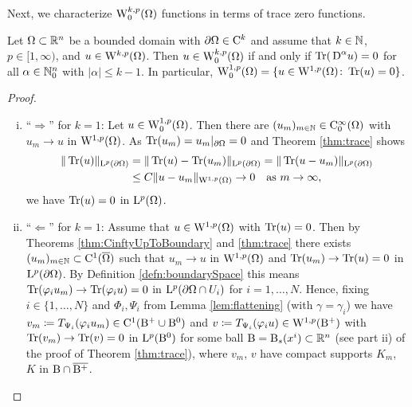 Next, we characterize $\mathrm{W}_0^{k,p}(\Omega)$ functions in terms of trace zero functions.

\begin{thm}
  Let $\Omega \subset \mathbb{R}^n$ be a bounded domain with $\partial\Omega \in \mathrm{C}^k$ and assume that $k \in \mathbb{N}$, $p \in [ 1, \infty)$, and $u \in \mathrm{W}^{k,p}(\Omega)$.
    Then
    $
    u \in \mathrm{W}_0^{k,p}(\Omega)$ if and only if $\operatorname{Tr}(\,{\operatorname{D}}^\alpha u) = 0$ for all  $\alpha \in \mathbb{N}_0^n$ with $|\alpha| \leq k - 1$.
    In particular, $\mathrm{W}_0^{1,p}(\Omega) = \{ u \in \mathrm{W}^{1,p}(\Omega) \colon \operatorname{Tr}(u) = 0 \}$.
\end{thm}

\begin{proof}
  \begin{enumerate}[i)]
    \item ``$\Rightarrow$'' for $k = 1$:
      Let $u \in \mathrm{W}_0^{1,p}(\Omega)$.
      Then there are $(u_m)_{m \in \mathbb{N}} \in \mathrm{C}_0^\infty(\Omega)$ with $u_m \to u$ in $\mathrm{W}^{1,p}(\Omega)$.
      As $\operatorname{Tr}(u_m) = u_m|_{\partial\Omega} = 0$ and Theorem \ref{thm:trace} shows
      \begin{align*}
        \| \operatorname{Tr}(u) \|_{\mathrm{L}^p(\partial\Omega)}
        &= \|\operatorname{Tr}(u) - \operatorname{Tr}(u_m)\|_{\mathrm{L}^p(\partial\Omega)}
        = \| \operatorname{Tr}(u - u_m) \|_{\mathrm{L}^p(\partial\Omega)} \\
        &\leq C \|u - u_m\|_{\mathrm{W}^{1,p}(\Omega)} \to 0 \quad \text{as } m \to \infty,
      \end{align*}
      we have $\operatorname{Tr}(u) = 0$ in $\mathrm{L}^p(\Omega)$.

    \item ``$\Leftarrow$'' for $k = 1$:
    Assume that $u \in \mathrm{W}^{1,p}(\Omega)$ with $\operatorname{Tr}(u) = 0$.
    Then by Theorems \ref{thm:CinftyUpToBoundary} and \ref{thm:trace} there exists $(u_m)_{m \in \mathbb{N}} \subset \mathrm{C}^1(\overline\Omega)$ such that $u_m \to u$ in $\mathrm{W}^{1,p}(\Omega)$ and $\operatorname{Tr}(u_m) \to \operatorname{Tr}(u) = 0$ in $\mathrm{L}^p(\partial\Omega)$.
    By Definition \ref{defn:boundarySpace} this means $\operatorname{Tr}(\varphi_i u_m) \to \operatorname{Tr}(\varphi_i u) = 0$ in $\mathrm{L}^p(\partial\Omega \cap U_i)$ for $i = 1,\dots,N$.
    Hence, fixing $i \in \{1, \dots, N\}$ and $\Phi_i, \Psi_i$ from Lemma \ref{lem:flattening} (with $\gamma = \gamma_i$) we have $v_m \coloneqq T_{\Psi_i}(\varphi_i u_m) \in \mathrm{C}^1(\mathrm{B}^+ \cup \mathrm{B}^0)$ and $v \coloneqq T_{\Psi_i}(\varphi_i u) \in \mathrm{W}^{1,p}(\mathrm{B}^+)$ with $\operatorname{Tr}(v_m) \to \operatorname{Tr}(v) = 0$ in $\mathrm{L}^p(\mathrm{B}^0)$ for some ball $\mathrm{B} = \mathrm{B}_s(x^i) \subset \mathbb{R}^n$ (see part ii) of the proof of Theorem \ref{thm:trace}), where $v_m$, $v$ have compact supports $K_m$, $K$ in $\mathrm{B} \cap \overline{\mathrm{B}^+}$.


\end{enumerate}
\end{proof}
